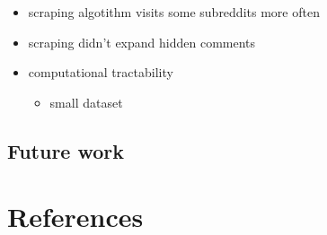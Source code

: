 \documentclass[
]{article}
\providecommand{\tightlist}{%
  \setlength{\itemsep}{0pt}\setlength{\parskip}{0pt}}
\begin{document}
\begin{itemize}
\tightlist
\item
  scraping algotithm visits some subreddits more often
\item
  scraping didn't expand hidden comments
\item
  computational tractability

  \begin{itemize}
  \tightlist
  \item
    small dataset
  \end{itemize}
\end{itemize}

\hypertarget{future-work}{%
\subsection{Future work}\label{future-work}}

\newpage

\hypertarget{references}{%
\section{References}\label{references}}
\end{document}

